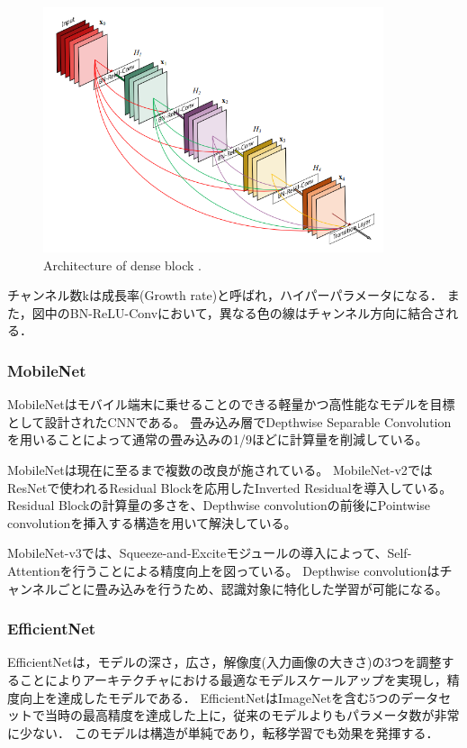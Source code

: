     \begin{figure}[ht]
      \centering
      \includegraphics[width=10cm]{8_appendix/img/denseblock}
      \caption{Architecture of dense block \cite{huang2017densely}.}
      \label{fig:huang2017densely}
    \end{figure}
    
    チャンネル数kは成長率(Growth rate)と呼ばれ，ハイパーパラメータになる．
    また，図中のBN-ReLU-Convにおいて，異なる色の線はチャンネル方向に結合される．

\subsubsection{MobileNet}
    MobileNet\cite{howard2017mobilenets}はモバイル端末に乗せることのできる軽量かつ高性能なモデルを目標として設計されたCNNである。
    畳み込み層でDepthwise Separable Convolutionを用いることによって通常の畳み込みの1/9ほどに計算量を削減している。
    
    MobileNetは現在に至るまで複数の改良が施されている。
    MobileNet-v2\cite{sandler2018mobilenetv2}ではResNetで使われるResidual Blockを応用したInverted Residualを導入している。
    Residual Blockの計算量の多さを、Depthwise convolutionの前後にPointwise convolutionを挿入する構造を用いて解決している。
    
    MobileNet-v3\cite{howard2019searching}では、Squeeze-and-Exciteモジュールの導入によって、Self-Attentionを行うことによる精度向上を図っている。
    Depthwise convolutionはチャンネルごとに畳み込みを行うため、認識対象に特化した学習が可能になる。

\subsubsection{EfficientNet}
    EfficientNet\cite{tan2019efficientnet}は，モデルの深さ，広さ，解像度(入力画像の大きさ)の3つを調整することによりアーキテクチャにおける最適なモデルスケールアップを実現し，精度向上を達成したモデルである．
    EfficientNetはImageNetを含む5つのデータセットで当時の最高精度を達成した上に，従来のモデルよりもパラメータ数が非常に少ない．
    このモデルは構造が単純であり，転移学習でも効果を発揮する．
    
